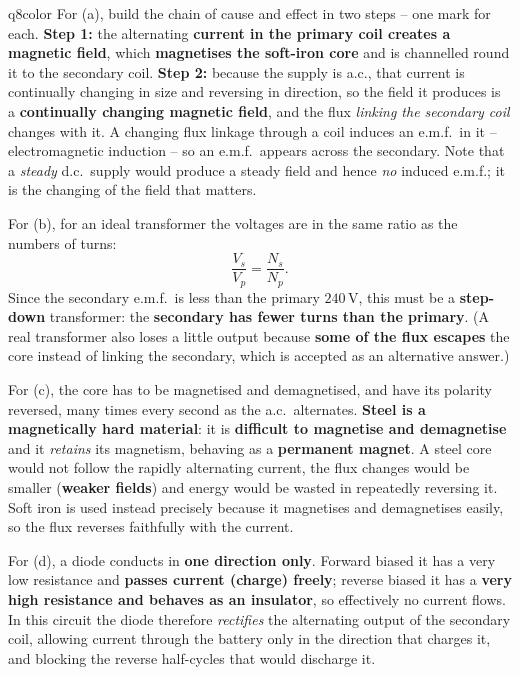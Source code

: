 \documentclass[11pt,a4paper]{article}
\begin{document}
\begin{ansbox}{q8color}
For (a), build the chain of cause and effect in two steps -- one mark for each. \textbf{Step 1:} the alternating \textbf{current in the primary coil creates a magnetic field}, which \textbf{magnetises the soft-iron core} and is channelled round it to the secondary coil. \textbf{Step 2:} because the supply is a.c., that current is continually changing in size and reversing in direction, so the field it produces is a \textbf{continually changing magnetic field}, and the flux \emph{linking the secondary coil} changes with it. A changing flux linkage through a coil induces an e.m.f.\ in it -- electromagnetic induction -- so an e.m.f.\ appears across the secondary. Note that a \emph{steady} d.c.\ supply would produce a steady field and hence \emph{no} induced e.m.f.; it is the changing of the field that matters.

For (b), for an ideal transformer the voltages are in the same ratio as the numbers of turns:
\[ \frac{V_s}{V_p} = \frac{N_s}{N_p}. \]
Since the secondary e.m.f.\ is less than the primary $240$\,V, this must be a \textbf{step-down} transformer: the \textbf{secondary has fewer turns than the primary}. (A real transformer also loses a little output because \textbf{some of the flux escapes} the core instead of linking the secondary, which is accepted as an alternative answer.)

For (c), the core has to be magnetised and demagnetised, and have its polarity reversed, many times every second as the a.c.\ alternates. \textbf{Steel is a magnetically hard material}: it is \textbf{difficult to magnetise and demagnetise} and it \emph{retains} its magnetism, behaving as a \textbf{permanent magnet}. A steel core would not follow the rapidly alternating current, the flux changes would be smaller (\textbf{weaker fields}) and energy would be wasted in repeatedly reversing it. Soft iron is used instead precisely because it magnetises and demagnetises easily, so the flux reverses faithfully with the current.

For (d), a diode conducts in \textbf{one direction only}. Forward biased it has a very low resistance and \textbf{passes current (charge) freely}; reverse biased it has a \textbf{very high resistance and behaves as an insulator}, so effectively no current flows. In this circuit the diode therefore \emph{rectifies} the alternating output of the secondary coil, allowing current through the battery only in the direction that charges it, and blocking the reverse half-cycles that would discharge it.
\end{ansbox}
\end{document}
